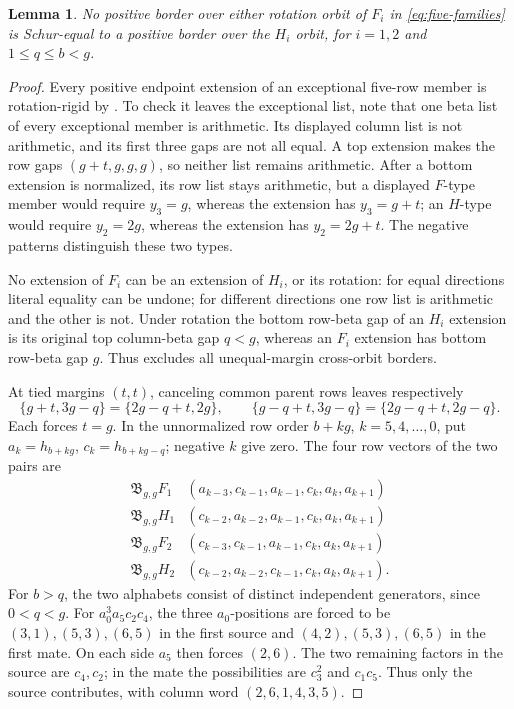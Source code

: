 \documentclass[11pt,a4paper]{amsart}
\numberwithin{equation}{section}
\theoremstyle{plain}
\newtheorem{lemma}[theorem]{Lemma}
\theoremstyle{definition}
\newcommand{\B}{\mathfrak B}
\begin{document}
\begin{lemma}\label{lem:five-exceptional-borders}
No positive border over either rotation orbit of \(F_i\) in
\eqref{eq:five-families} is Schur-equal to a positive border over the
\(H_i\) orbit, for \(i=1,2\) and \(1\le q\le b<g\).
\end{lemma}

\begin{proof}
Every positive endpoint extension of an exceptional five-row member is
rotation-rigid by .  To check it leaves the exceptional
list, note that one beta list of every exceptional member is arithmetic.
Its displayed column list is not arithmetic, and its first three gaps
are not all equal.  A top extension makes the row gaps
\((g+t,g,g,g)\), so neither list remains arithmetic.
After a bottom extension is normalized, its row list stays arithmetic,
but a displayed \(F\)-type member would require \(y_3=g\), whereas the
extension has \(y_3=g+t\); an \(H\)-type would require \(y_2=2g\),
whereas the extension has \(y_2=2g+t\).
The negative patterns distinguish these two types.

No extension of \(F_i\) can be an extension of \(H_i\), or its rotation:
for equal directions literal equality can be undone; for different
directions one row list is arithmetic and the other is not.
Under rotation the bottom row-beta gap of an \(H_i\) extension is its
original top column-beta gap \(q<g\), whereas an \(F_i\) extension has
bottom row-beta gap \(g\).
Thus  excludes all unequal-margin cross-orbit borders.

At tied margins \((t,t)\), canceling common parent rows leaves respectively
\[
 \{g+t,3g-q\}=\{2g-q+t,2g\},\qquad
 \{g-q+t,3g-q\}=\{2g-q+t,2g-q\}.
\]
Each forces \(t=g\).  In the unnormalized row order \(b+kg\),
\(k=5,4,\ldots,0\), put \(a_k=h_{b+kg}\),
\(c_k=h_{b+kg-q}\); negative \(k\) give zero.
The four row vectors of the two pairs are
\[
\begin{array}{c|c}
\B_{g,g}F_1&(a_{k-3},c_{k-1},a_{k-1},c_k,a_k,a_{k+1})\\
\B_{g,g}H_1&(c_{k-2},a_{k-2},a_{k-1},c_k,a_k,a_{k+1})\\
\B_{g,g}F_2&(c_{k-3},c_{k-1},a_{k-1},c_k,a_k,a_{k+1})\\
\B_{g,g}H_2&(c_{k-2},a_{k-2},c_{k-1},c_k,a_k,a_{k+1}).
\end{array}
\]
For \(b>q\), the two alphabets consist of distinct independent
generators, since \(0<q<g\).  For \(a_0^3a_5c_2c_4\), the three
\(a_0\)-positions are forced to be
\((3,1),(5,3),(6,5)\) in the first source and
\((4,2),(5,3),(6,5)\) in the first mate.  On each side \(a_5\)
then forces \((2,6)\).  The two remaining factors in the source are
\(c_4,c_2\); in the mate the possibilities are \(c_3^2\) and
\(c_1c_5\).  Thus only the source contributes, with column word
\((2,6,1,4,3,5)\).  


\end{proof}
\end{document}
